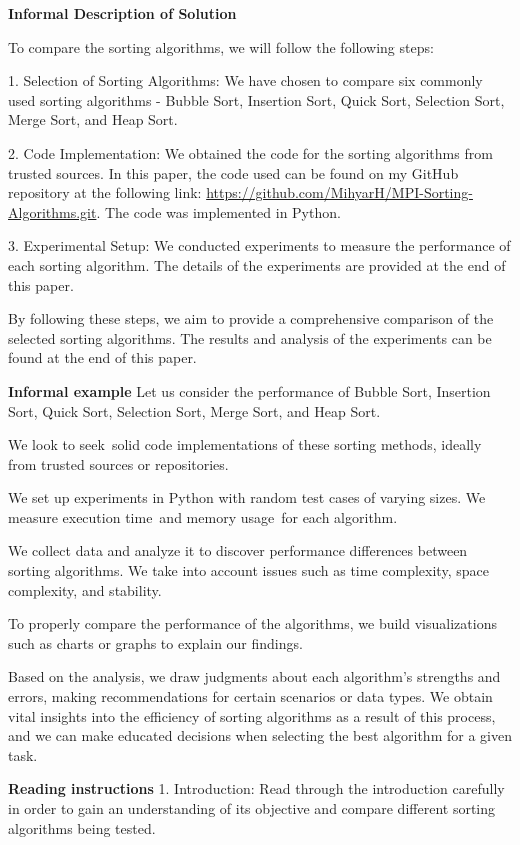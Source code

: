 \documentclass{article}
\begin{document}
\textbf{\large Informal Description of Solution}

To compare the sorting algorithms, we will follow the following steps: 

1. Selection of Sorting Algorithms: We have chosen to compare six commonly used sorting algorithms - Bubble Sort, Insertion Sort, Quick Sort, Selection Sort, Merge Sort, and Heap Sort.

2. Code Implementation: We obtained the code for the sorting algorithms from trusted sources. In this paper, the code used can be found on my GitHub repository at the following link: \url{https://github.com/MihyarH/MPI-Sorting-Algorithms.git}. The code was implemented in Python.

3. Experimental Setup: We conducted experiments to measure the performance of each sorting algorithm. The details of the experiments are provided at the end of this paper.

By following these steps, we aim to provide a comprehensive comparison of the selected sorting algorithms. The results and analysis of the experiments can be found at the end of this paper.


\textbf{\large Informal example}
Let us consider the performance of Bubble Sort, Insertion Sort, Quick Sort, Selection Sort, Merge Sort, and Heap Sort.

We look to seek solid code implementations of these sorting methods, ideally from trusted sources or repositories.

We set up experiments in Python with random test cases of varying sizes. We measure execution time and memory usage for each algorithm.

We collect data and analyze it to discover performance differences between sorting algorithms. We take into account issues such as time complexity, space complexity, and stability.

To properly compare the performance of the algorithms, we build visualizations such as charts or graphs to explain our findings.

Based on the analysis, we draw judgments about each algorithm's strengths and errors, making recommendations for certain scenarios or data types.
We obtain vital insights into the efficiency of sorting algorithms as a result of this process, and we can make educated decisions when selecting the best algorithm for a given task.

\textbf{\large Reading instructions}
1. Introduction: Read through the introduction carefully in order to gain an understanding of its objective and compare different sorting algorithms being tested.
\end{document}
